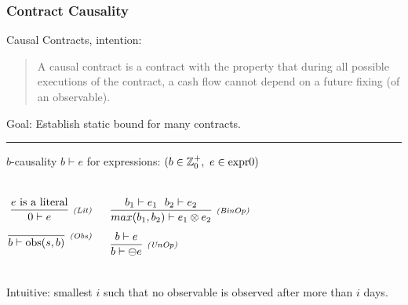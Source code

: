 \documentclass[xcolor=dvipsnames,12pt]{beamer}
\newcommand{\comment}[2]{{\tiny \color{Orange}{$\spadesuit${\bf #1: }{\sf #2}$\spadesuit$}}}
\newcommand{\jbcomment}[1]{\comment{JB}{#1}}
\renewcommand{\emph}[1]{\textcolor{structure!60}{#1}}
\begin{document}
\newcommand{\crule}[3]{\frac{#2}{#3}\ \mbox{\scriptsize \it #1}}

\begin{frame}[t]
    \frametitle{Contract Causality}

\emph{Causal Contracts, intention:}
{\footnotesize
\begin{quote}
 A \emph{causal contract} is a contract with the property that during all
   possible executions of the contract, a cash flow cannot depend on a
   future fixing (of an observable).
\end{quote}
Goal: Establish static bound for many contracts.
}
\smallskip
\hrule

\pause

\medskip

\emph{$b$-causality} $ b \vdash e$ for \emph{expressions}:
{\scriptsize $ (b \in \mathbb{Z}_0^+, \ e \in \ttt{expr0})$}

\begin{columns}
\begin{align*}
\crule{(Lit)}{e \mbox{ is a literal}}{0 \vdash e}&\\[1ex]
 \crule{(Obs)}{}{b \vdash \ttt{obs}(s,b)}&\\
\end{align*}

\begin{align*}
&\crule{(BinOp)}{b_1 \vdash e_1\ \ b_2 \vdash e_2 }{max(b_1,b_2) \vdash e_1 \otimes e_2}\\[1ex]
&\crule{(UnOp)}{b \vdash e}{b \vdash \ominus e}\\
\end{align*}
\end{columns}
Intuitive: smallest $i$ such that no observable is observed \emph{after more than $i$ days}.

\end{frame}
\end{document}
